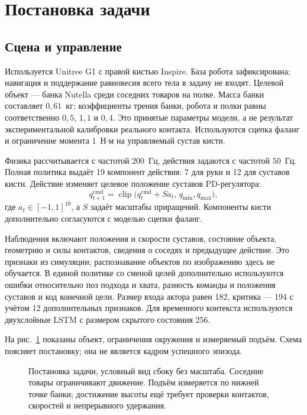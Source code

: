 \documentclass{misisarticle}
\begin{document}
\section{Постановка задачи}
\subsection{Сцена и управление}
Используется Unitree G1 с правой кистью Inspire. База робота зафиксирована; навигация и поддержание равновесия всего тела в задачу не входят. Целевой объект --- банка Nutella среди соседних товаров на полке. Масса банки составляет $0{,}61$~кг; коэффициенты трения банки, робота и полки равны соответственно $0{,}5$, $1{,}1$ и $0{,}4$. Это принятые параметры модели, а не результат экспериментальной калибровки реального контакта. Используются сцепка фаланг и ограничение момента $1$~Н$\cdot$м на управляемый сустав кисти.

Физика рассчитывается с частотой $200$~Гц, действия задаются с частотой $50$~Гц. Полная политика выдаёт 19 компонент действия: 7 для руки и 12 для суставов кисти. Действие изменяет целевое положение суставов PD-регулятора:
\begin{equation}
 q^{\mathrm{cmd}}_{t+1}=\operatorname{clip}
 \bigl(q^{\mathrm{cmd}}_t+S a_t,\,q_{\min},q_{\max}\bigr),
\end{equation}
где $a_t\in[-1,1]^{19}$, а $S$ задаёт масштабы приращений. Компоненты кисти дополнительно согласуются с моделью сцепки фаланг.

Наблюдения включают положения и скорости суставов, состояние объекта, геометрию и силы контактов, сведения о соседях и предыдущее действие. Это признаки из симуляции; распознавание объектов по изображению здесь не обучается. В единой политике со сменой целей дополнительно используются ошибки относительно поз подхода и хвата, разность команды и положения суставов и код конечной цели. Размер входа актора равен 182, критика --- 194 с учётом 12 дополнительных признаков. Для временного контекста используются двухслойные LSTM с размером скрытого состояния 256.

На рис.~\ref{fig:task} показаны объект, ограничения окружения и измеряемый подъём. Схема поясняет постановку; она не является кадром успешного эпизода.
\begin{figure}[tb]
\centering

\caption{Постановка задачи, условный вид сбоку без масштаба. Соседние товары ограничивают движение. Подъём измеряется по нижней точке банки; достижение высоты ещё требует проверки контактов, скоростей и непрерывного удержания.}
\label{fig:task}
\end{figure}
\end{document}
